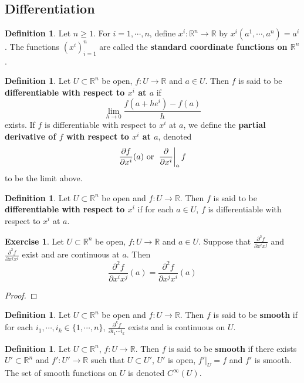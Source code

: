 \documentclass[12pt]{amsart}
\theoremstyle{definition}
\newtheorem{defn}[definition]{Definition}
\newtheorem{ex}[definition]{Exercise}
\newcommand{\R}{\mathbb{R}}
\begin{document}
	\subsection{Differentiation}
	
	\begin{defn}
		Let $n \geq 1$. For $i = 1, \cdots, n$, define $x^i: \R^n \rightarrow \R$ by $x^i(a^1, \cdots, a^n) = a^i$. The functions $(x^i)_{i=1}^n$ are called the \textbf{standard coordinate functions on $\R^n$}. 
	\end{defn}
	
	\begin{defn} 
		Let $U \subset \R^n$ be open, $f: U \rightarrow \R$ and $a \in U$. Then $f$ is said to be \textbf{differentiable with respect to $x^i$ at $a$} if $$\lim\limits_{h \rightarrow 0} \frac{f(a + he^i) - f(a)}{h}$$ exists. If $f$ is differentiable with respect to $x^i$ at $a$, we define the \textbf{partial derivative of $f$ with respect to $x^i$ at $a$}, denoted $$\frac{\partial f}{\partial x^i} (a) \text{ or } \eval{\pdv{x^i}}_{a} f $$ to be the limit above.
		
	\end{defn}
		
	\begin{defn}
		Let $U \subset \R^n$ be open and $f: U \rightarrow \R$. Then $f$ is said to be \textbf{differentiable with respect to $x^i$} if for each $a \in U$, $f$ is differentiable with respect to $x^i$ at $a$.
	\end{defn}

	\begin{ex}
		Let $U \subset \R^n$ be open, $f: U \rightarrow \R$ and $a \in U$. Suppose that $\frac{\partial ^2 f}{\partial x^i x^j}$ and $\frac{\partial ^2 f}{\partial x^j x^i}$ exist and are continuous at $a$. Then $$\frac{\partial ^2 f}{\partial x^i x^j} (a) = \frac{\partial ^2 f}{\partial x^j x^i} (a)$$
	\end{ex}

	\begin{proof}
		
	\end{proof}

	\begin{defn}
		Let $U \subset \R^n$ be open and $f: U \rightarrow \R$. Then $f$ is said to be \textbf{smooth} if for each $i_1, \cdots, i_k \in \{1, \cdots, n\}$, $\frac{\partial^k f}{\partial i_1 \cdots i_k}$ exists and is continuous on $U$.
	\end{defn}

	\begin{defn}
		Let $U \subset \R^n$, $f: U \rightarrow \R$. Then $f$ is said to be \textbf{smooth} if there exists $U' 
		\subset \R^n$ and $f':U' \rightarrow \R$ such that $U \subset U'$, $U'$ is open, $f'|_U = f$ and $f'$ is smooth. The set of smooth functions on $U$ is denoted $C^{\infty}(U)$.
	\end{defn}
\end{document}
